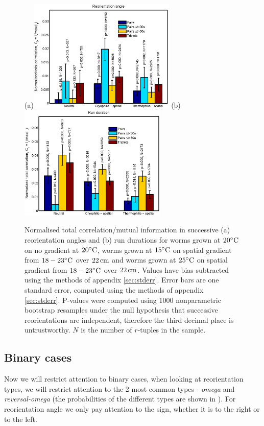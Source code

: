 \documentclass[12pt]{article}
\begin{document}
\begin{figure}
  \begin{center}
    (a)\includegraphics[width=7cm]{reoangle3.eps}
    (b)\includegraphics[width=7cm]{rundur3.eps}
  \end{center}
  \caption{Normalised total correlation/mutual information in successive (a) reorientation angles and (b) run durations for worms grown at $20^\circ\mathrm{C}$ on no gradient at $20^\circ\mathrm{C}$, worms grown at $15^\circ\mathrm{C}$ on spatial gradient from $18-23^\circ\mathrm{C}$ over $22\,\mathrm{cm}$ and worms grown at $25^\circ\mathrm{C}$ on spatial gradient from $18-23^\circ\mathrm{C}$ over $22\,\mathrm{cm}$. Values have bias subtracted using the methods of appendix \ref{sec:stderr}. Error bars are one standard error, computed using the methods of appendix \ref{sec:stderr}. P-values were computed using 1000 nonparametric bootstrap resamples under the null hypothesis that successive reorientations are independent, therefore the third decimal place is untrustworthy. $N$ is the number of $r$-tuples in the sample.} \label{fig:ctsresults}
\end{figure}

\subsection{Binary cases}\label{sec:binaryresults}

Now we will restrict attention to binary cases, \ie when looking at reorientation types, we will restrict attention to the 2 most common types - \emph{omega} and \emph{reversal-omega} (the probabilities of the different types are shown in ). For reorientation angle we only pay attention to the sign, \ie whether it is to the right or to the left.
\end{document}
